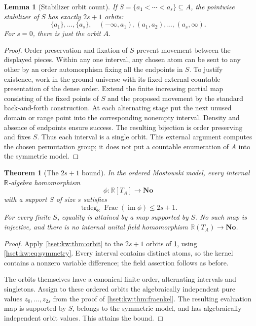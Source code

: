 \documentclass[11pt,letterpaper]{article}
\newtheorem{theorem}{Theorem}[section]
\newtheorem{lemma}[lemma]{Lemma}\aliascntresetthe{lemma}
\theoremstyle{definition}
\theoremstyle{remark}
\newcommand{\No}{\mathbf{No}}
\newcommand{\R}{\mathbb R}
\newcommand{\Frac}{\operatorname{Frac}}
\newcommand{\trdeg}{\operatorname{trdeg}}
\newcommand{\im}{\operatorname{im}}
\begin{document}
\begin{lemma}[Stabilizer orbit count]\label{hset:kw:lem:intervalorbits}
If $S=\{a_1<\cdots<a_s\}\subseteq A$, the pointwise stabilizer of $S$ has exactly $2s+1$ orbits:
\[
\{a_1\},\ldots,\{a_s\},\quad
(-\infty,a_1),(a_1,a_2),\ldots,(a_s,\infty).
\]
For $s=0$, there is just the orbit $A$.
\end{lemma}
\begin{proof}
Order preservation and fixation of $S$ prevent movement between the displayed pieces. Within any one interval, any chosen atom can be sent to any other by an order automorphism fixing all the endpoints in $S$. To justify existence, work in the ground universe with its fixed external countable presentation of the dense order. Extend the finite increasing partial map consisting of the fixed points of $S$ and the proposed movement by the standard back-and-forth construction. At each alternating stage put the next unused domain or range point into the corresponding nonempty interval. Density and absence of endpoints ensure success. The resulting bijection is order preserving and fixes $S$. Thus each interval is a single orbit. This external argument computes the chosen permutation group; it does not put a countable enumeration of $A$ into the symmetric model.
\end{proof}

\begin{theorem}[The $2s+1$ bound]\label{hset:kw:thm:mostowski}
In the ordered Mostowski model, every internal $\R$-algebra homomorphism
\[
\phi:\R[T_A]\longrightarrow\No
\]
with a support $S$ of size $s$ satisfies
\begin{equation}\label{hset:kw:eq:mostowskibound}
\trdeg_\R\Frac(\im\phi)\le 2s+1.
\end{equation}
For every finite $S$, equality is attained by a map supported by $S$. No such map is injective, and there is no internal unital field homomorphism $\R(T_A)\to\No$.
\end{theorem}
\begin{proof}
Apply \cref{hset:kw:thm:orbit} to the $2s+1$ orbits of \cref{hset:kw:lem:intervalorbits}, using \eqref{hset:kw:eq:symmetry}. Every interval contains distinct atoms, so the kernel contains a nonzero variable difference; the field assertion follows as before.

The orbits themselves have a canonical finite order, alternating intervals and singletons. Assign to these ordered orbits the algebraically independent pure values $z_0,\ldots,z_{2s}$ from the proof of \cref{hset:kw:thm:fraenkel}. The resulting evaluation map is supported by $S$, belongs to the symmetric model, and has algebraically independent orbit values. This attains the bound.
\end{proof}
\end{document}
